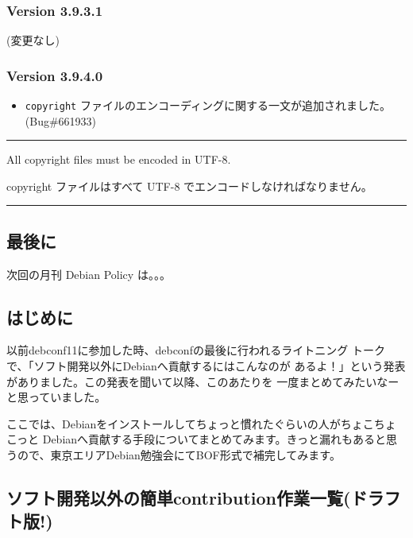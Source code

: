 \documentclass[mingoth,a4paper]{jsarticle}
\begin{document}
\subsubsection{Version 3.9.3.1}

(変更なし)

\subsubsection{Version 3.9.4.0}
\begin{itemize}
\item {\tt copyright} ファイルのエンコーディングに関する一文が追加されました。(Bug\#661933)
\end{itemize}

\vspace{1ex}
\hrule
{}\par
\parbox{0.48\linewidth}{
	  All copyright files must be encoded in UTF-8.
}\hfil 
\parbox{0.48\linewidth}{
	  copyright ファイルはすべて UTF-8 でエンコードしなければなりません。
}
\hrule
\vspace{1ex}

\subsection{最後に}
次回の月刊 Debian Policy は。。。


\subsection{はじめに}

 以前debconf11に参加した時、debconfの最後に行われるライトニング
トークで、「ソフト開発以外にDebianへ貢献するにはこんなのが
あるよ！」という発表がありました。この発表を聞いて以降、このあたりを
一度まとめてみたいなーと思っていました。

 ここでは、Debianをインストールしてちょっと慣れたぐらいの人がちょこちょこっと
Debianへ貢献する手段についてまとめてみます。きっと漏れもあると思うので、東京エリアDebian勉強会にてBOF形式で補完してみます。

\subsection{ソフト開発以外の簡単contribution作業一覧(ドラフト版!)}
\end{document}
